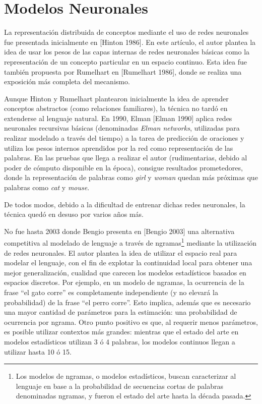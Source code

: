 \section{Modelos Neuronales}

La representación distribuida de conceptos mediante el uso de redes neuronales fue presentada
inicialmente en [Hinton 1986]. En este artículo, el autor plantea la idea de usar los pesos de las
capas internas de redes neuronales básicas como la representación de un concepto particular en un
espacio continuo. Esta idea fue también propuesta por Rumelhart en [Rumelhart 1986], donde se
realiza una exposición más completa del mecanismo.

Aunque Hinton y Rumelhart plantearon inicialmente la idea de aprender conceptos abstractos (como
relaciones familiares), la técnica no tardó en extenderse al lenguaje natural. En 1990, Elman [Elman
1990] aplica redes neuronales recursivas básicas (denominadas \textit{Elman networks}, utilizadas
para realizar modelado a través del tiempo) a la tarea de predicción de oraciones y utiliza los
pesos internos aprendidos por la red como representación de las palabras. En las pruebas que llega a
realizar el autor (rudimentarias, debido al poder de cómputo disponible en la época), consigue
resultados prometedores, donde la representación de palabras como \textit{girl} y \textit{woman}
quedan más próximas que palabras como \textit{cat} y \textit{mouse}.

De todos modos, debido a la dificultad de entrenar dichas redes neuronales, la técnica quedó en
desuso por varios años más.

No fue hasta 2003 donde Bengio presenta en [Bengio 2003] una alternativa competitiva al modelado de
lenguaje a través de ngramas\footnote{Los modelos de ngramas, o modelos estadísticos, buscan
caracterizar al lenguaje en base a la probabilidad de secuencias cortas de palabras denominadas
ngramas, y fueron el estado del arte hasta la década pasada.} mediante la utilización de redes
neuronales. El autor plantea la idea de utilizar el espacio real para modelar el lenguaje, con el
fin de explotar la continuidad local para obtener una mejor generalización, cualidad que carecen los
modelos estadísticos basados en espacios discretos. Por ejemplo, en un modelo de ngramas, la
ocurrencia de la frase ``el gato corre'' es completamente independiente (y no elevará la
probabilidad) de la frase ``el perro corre''. Esto implica, además que es necesario una mayor
cantidad de parámetros para la estimación: una probabilidad de ocurrencia por ngrama. Otro punto
positivo es que, al requerir menos parámetros, es posible utilizar contextos más grandes: mientras
que el estado del arte en modelos estadísticos utilizan 3 ó 4 palabras, los modelos continuos llegan
a utilizar hasta 10 ó 15.

